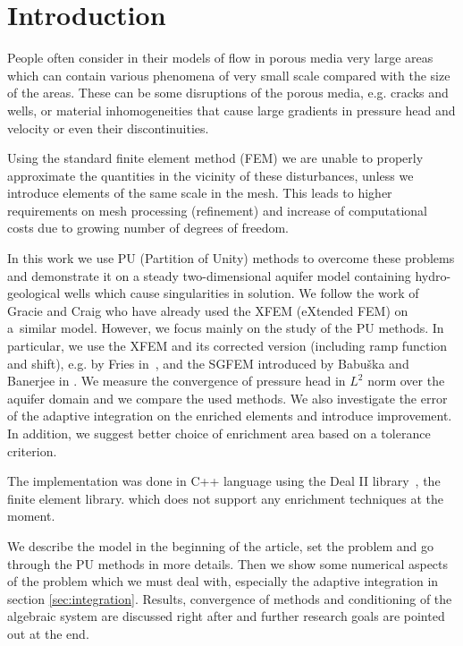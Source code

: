 \documentclass[preprint,12pt]{elsarticle}
\begin{document}

\section{Introduction}
\label{sec:introduction}

People often consider in their models of flow in porous media very large areas which can contain various 
phenomena of very small scale compared with the size of the areas. These can be some disruptions of the porous 
media, e.g. cracks and wells, or material inhomogeneities that cause large gradients in pressure head and 
velocity or even their discontinuities.

Using the standard finite element method (FEM) we are unable to properly approximate the quantities in the 
vicinity of these disturbances, unless we introduce elements of the same scale in the mesh. This leads to 
higher requirements on mesh processing (refinement) and increase of computational costs due to growing number  
of degrees of freedom.

In this work we use PU (Partition of Unity) methods to overcome these problems and demonstrate it on a steady 
two-dimensional aquifer model containing hydro-geological wells which cause singularities in solution. 
We follow the work \cite{gracie,craig} of Gracie and Craig who have already used the XFEM (eXtended FEM) 
on a~similar model. However, we focus mainly on the study of the PU methods. In particular, we use the XFEM 
and its corrected version (including ramp function and shift), e.g. by Fries in~\cite{cxfem}, 
and the SGFEM introduced by Babu{\v s}ka and Banerjee in \cite{sgfem,sgfem2013}. We measure 
the convergence of pressure head in $L^2$ norm over the aquifer domain and we compare the used methods. 
We also investigate the error of the adaptive integration on the enriched elements and introduce improvement. 
In addition, we suggest better choice of enrichment area based on a tolerance criterion.

The implementation was done in C++ language using the Deal II library~\cite{deal}, the finite element library.
which does not support any enrichment techniques at the moment.

We describe the model in the beginning of the article, set the problem and go through the
PU methods in more details. Then we show some numerical aspects of the problem which we must deal with, 
especially the adaptive integration in section \ref{sec:integration}. Results, convergence of methods and
conditioning of the algebraic system are discussed right after and further research goals are pointed out 
at the end. 
\end{document}

